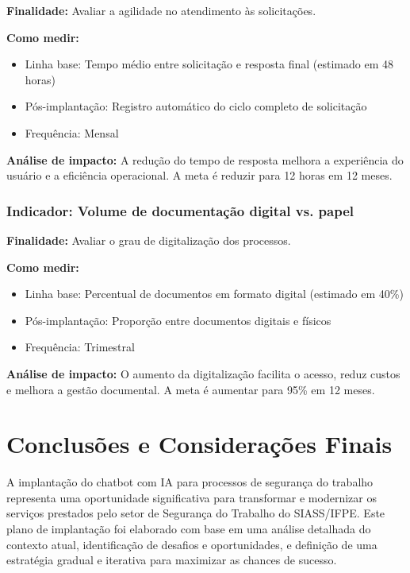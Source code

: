\documentclass[12pt,a4paper]{article}
\begin{document}
\textbf{Finalidade:} Avaliar a agilidade no atendimento às solicitações.

\textbf{Como medir:} 
\begin{itemize}
    \item Linha base: Tempo médio entre solicitação e resposta final (estimado em 48 horas)
    \item Pós-implantação: Registro automático do ciclo completo de solicitação
    \item Frequência: Mensal
\end{itemize}

\textbf{Análise de impacto:} A redução do tempo de resposta melhora a experiência do usuário e a eficiência operacional. A meta é reduzir para 12 horas em 12 meses.

\subsubsection{Indicador: Volume de documentação digital vs. papel}

\textbf{Finalidade:} Avaliar o grau de digitalização dos processos.

\textbf{Como medir:} 
\begin{itemize}
    \item Linha base: Percentual de documentos em formato digital (estimado em 40\%)
    \item Pós-implantação: Proporção entre documentos digitais e físicos
    \item Frequência: Trimestral
\end{itemize}

\textbf{Análise de impacto:} O aumento da digitalização facilita o acesso, reduz custos e melhora a gestão documental. A meta é aumentar para 95\% em 12 meses.

\clearpage
\section{Conclusões e Considerações Finais}

A implantação do chatbot com IA para processos de segurança do trabalho representa uma oportunidade significativa para transformar e modernizar os serviços prestados pelo setor de Segurança do Trabalho do SIASS/IFPE. Este plano de implantação foi elaborado com base em uma análise detalhada do contexto atual, identificação de desafios e oportunidades, e definição de uma estratégia gradual e iterativa para maximizar as chances de sucesso.
\end{document}
